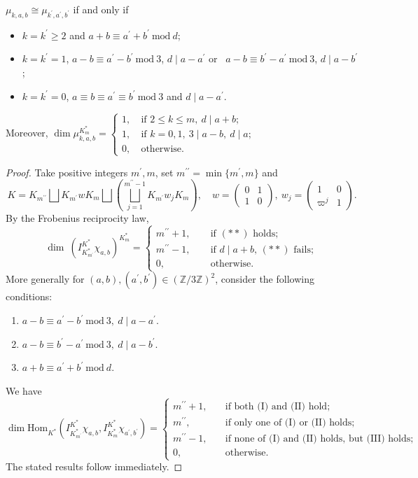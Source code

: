 \documentclass[10pt,a4paper]{amsart}
\newcommand{\BZ}{{\mathbb {Z}}}
\newcommand{\Hom}{{\mathrm{Hom}}}
\renewcommand{\mod}{\ \mathrm{mod}\ }\renewcommand{\Re}{{\mathrm{Re}}}
\begin{document}
\begin{lem}\label{irreI}$\mu_{k,a,b}\cong \mu_{k^\prime,a^\prime,b^\prime}$ if and only if 
\begin{itemize}
    \item $k=k^\prime\geq2$ and $a+b\equiv a^\prime+b^\prime \mod d$; 
    \item $k=k^\prime=1$, $a-b\equiv a^\prime-b^\prime \mod 3$, $d\mid a-a^\prime$ or \ $a-b\equiv b^\prime-a^\prime \mod 3$, $d\mid a-b^\prime$;
    \item $k=k^\prime=0$, $a\equiv b\equiv a^\prime\equiv b^\prime \mod 3$ and $d\mid a-a^\prime$.
\end{itemize} 
 Moreover,  $\dim \mu_{k,a,b}^{K_m^*}=\begin{cases} 1, &\ \text{if }2\leq k\leq m,\ d\mid a+b;\\ 
 1, &\ \text{if } k=0,1,\ 3\mid a-b,\ d\mid a;\\
0, &\ \text{otherwise}.\end{cases}$
\end{lem}

\begin{proof}Take positive integers $m^\prime,m$, set $m^{\prime\prime}=\min\{m^\prime,m\}$ and 
\[K=K_{m^{\prime\prime}}\bigsqcup K_{m^\prime} w K_m \bigsqcup \left(\bigsqcup_{j=1}^{m^{\prime\prime}-1} K_{m^\prime} w_j K_m\right),\quad w=\begin{pmatrix} 0 & 1\\ 1 & 0\end{pmatrix},\ w_j=\begin{pmatrix}1 & 0\\ \varpi^j & 1\end{pmatrix}.\]
By the Frobenius reciprocity law, 
\[\dim\ (I_{K_{m^\prime}^*}^{K^*}\chi_{a,b})^{K_m^*}=\begin{cases} m^{\prime\prime}+1,\quad &\ \text{if $(**)$ holds}; \\
m^{\prime\prime}-1,\quad &\ \text{if $d\mid a+b$, $(**)$ fails};\\ 
0,\quad &\  \text{otherwise}.\end{cases}\]
More generally for $(a,b),(a^\prime,b^\prime)\in(\BZ/3\BZ)^2$, consider 
the following conditions:
\begin{enumerate}
\item[(I)] $a-b\equiv a^\prime-b^\prime \mod 3,\ d\mid a-a^\prime$.
\item[(II)] $a-b\equiv b^\prime-a^\prime \mod 3,\ d\mid a-b^\prime$.
\item[(III)] $a+b\equiv a^\prime+b^\prime \mod d$.
\end{enumerate}
We have
\[\dim \Hom_{K^*}(I_{K_{m^\prime}^*}^{K^*}\chi_{a,b}, I_{K_m^*}^{K^*}\chi_{a^\prime,b^\prime})=\begin{cases} m^{\prime\prime}+1,\quad & \text{if both (I) and (II) hold};\\
m^{\prime\prime},\quad & \text{if only one of  (I) or (II) holds};  \\
m^{\prime\prime}-1,\quad &  
\text{if none of  (I) and (II) holds, but (III) holds};  \\
0, \quad &\text{otherwise.}\end{cases}\]
The stated results follow immediately.
\end{proof}
\end{document}
